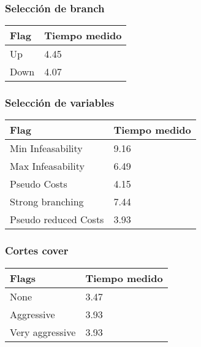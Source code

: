 \subsubsection{Selección de branch}

    \begin{center}
        \begin{tabular}{ | m{7em} | m{5cm} | }
        \hline
        Flag & Tiempo medido \\
        \hline
        Up & 4.45 \\
        \hline
        Down & 4.07 \\
        \hline
        \end{tabular}
    \end{center}

\subsubsection{Selección de variables}

    \begin{center}
        \begin{tabular}{ | m{11em} | m{5cm} | }
        \hline
        Flag & Tiempo medido \\
        \hline
        Min Infeasability & 9.16 \\
        \hline
        Max Infeasability & 6.49 \\
        \hline
        Pseudo Costs & 4.15 \\
        \hline
        Strong branching & 7.44 \\
        \hline
        Pseudo reduced Costs & 3.93 \\
        \hline
        \end{tabular}
    \end{center}

\subsubsection{Cortes cover}

    \begin{center}
        \begin{tabular}{ | m{7em} | m{5cm} | }
        \hline
        Flags  & Tiempo medido \\
        \hline
        None  & 3.47 \\
        \hline
        Aggressive  & 3.93 \\
        \hline
        Very aggressive  & 3.93 \\
        \hline
        \end{tabular}
    \end{center}

